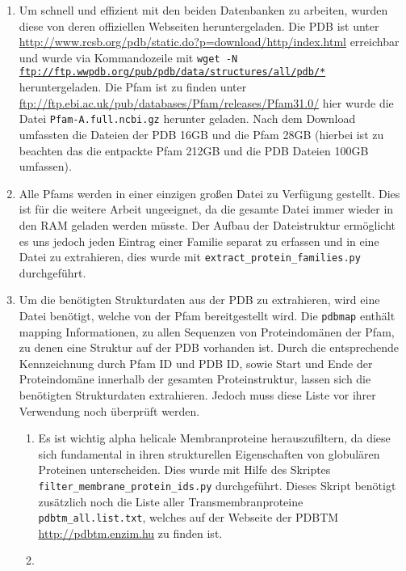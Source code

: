 \begin{enumerate}
\item
    \begin{sloppypar}
    Um schnell und effizient mit den beiden Datenbanken zu arbeiten, wurden diese von deren offiziellen Webseiten heruntergeladen. Die \ac{PDB} ist unter \url{http://www.rcsb.org/pdb/static.do?p=download/http/index.html} erreichbar und wurde via Kommandozeile mit \texttt{wget -N \url{ftp://ftp.wwpdb.org/pub/pdb/data/structures/all/pdb/*}} heruntergeladen. Die \ac{Pfam} ist zu finden unter \url{ftp://ftp.ebi.ac.uk/pub/databases/Pfam/releases/Pfam31.0/} hier wurde die Datei \texttt{Pfam-A.full.ncbi.gz} herunter geladen. Nach dem Download umfassten die Dateien der \ac{PDB} 16GB und die \ac{Pfam} 28GB (hierbei ist zu beachten das die entpackte \ac{Pfam} 212GB und die \ac{PDB} Dateien 100GB umfassen).
    \end{sloppypar}
\item
    Alle \ac{Pfams} werden in einer einzigen großen Datei zu Verfügung gestellt. Dies ist für die weitere Arbeit ungeeignet, da die gesamte Datei immer wieder in den \ac{RAM} geladen werden müsste. Der Aufbau der Dateistruktur ermöglicht es uns jedoch jeden Eintrag einer Familie separat zu erfassen und in eine Datei zu extrahieren, dies wurde mit \texttt{extract\_protein\_families.py} durchgeführt.
\item
    Um die benötigten Strukturdaten aus der PDB zu extrahieren, wird eine Datei benötigt, welche von der Pfam bereitgestellt wird. Die \texttt{pdbmap} enthält mapping Informationen, zu allen Sequenzen von Proteindomänen der \ac{Pfam}, zu denen eine Struktur auf der \ac{PDB} vorhanden ist. Durch die entsprechende Kennzeichnung durch \ac{Pfam} ID und \ac{PDB} ID, sowie Start und Ende der Proteindomäne innerhalb der gesamten Proteinstruktur, lassen sich die benötigten Strukturdaten extrahieren. Jedoch muss diese Liste vor ihrer Verwendung noch überprüft werden.
    \begin{enumerate}
        \item 
        Es ist wichtig alpha helicale Membranproteine herauszufiltern, da diese sich fundamental in ihren strukturellen Eigenschaften von globulären Proteinen unterscheiden. Dies wurde mit Hilfe des Skriptes \texttt{filter\_membrane\_protein\_ids.py} durchgeführt. Dieses Skript benötigt zusätzlich noch die Liste aller Transmembranproteine \texttt{pdbtm\_all.list.txt}, welches auf der Webseite der \ac{PDBTM} \url{http://pdbtm.enzim.hu} zu finden ist.
        \item

\end{enumerate}
\end{enumerate}
